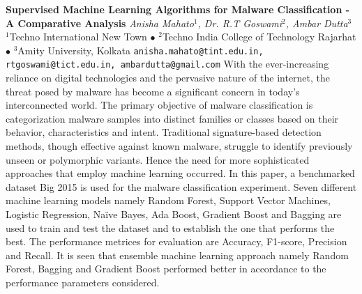 
    \begin{conf-abstract}[]
        {\textbf{Supervised Machine Learning Algorithms for Malware Classification - A Comparative Analysis}}
        {\textit{Anisha Mahato$^{1}$, Dr. R.T Goswami$^{2}$, Ambar Dutta$^{3}$}}
        {$^{1}$Techno International New Town $\bullet$ $^{2}$Techno India College of Technology Rajarhat $\bullet$ $^{3}$Amity University, Kolkata}
        {\texttt{anisha.mahato@tint.edu.in, rtgoswami@tict.edu.in, ambardutta@gmail.com}}
        {With the ever-increasing reliance on digital technologies and the pervasive nature of the internet, the threat posed by malware has become a significant concern in today's interconnected world. The primary objective of malware classification is categorization malware samples into distinct families or classes based on their behavior, characteristics and intent. Traditional signature-based detection methods, though effective against known malware, struggle to identify previously unseen or polymorphic variants. Hence the need for more sophisticated approaches that employ machine learning occurred. In this paper, a benchmarked dataset Big 2015 is used for the malware classification experiment. Seven different machine learning models namely Random Forest, Support Vector Machines, Logistic Regression, Naïve Bayes, Ada Boost, Gradient Boost and Bagging are used to train and test the dataset and to establish the one that performs the best. The performance metrices for evaluation are Accuracy, F1-score, Precision and Recall. It is seen that ensemble machine learning approach namely Random Forest, Bagging and Gradient Boost performed better in accordance to the performance parameters considered.}
    \end{conf-abstract}
        